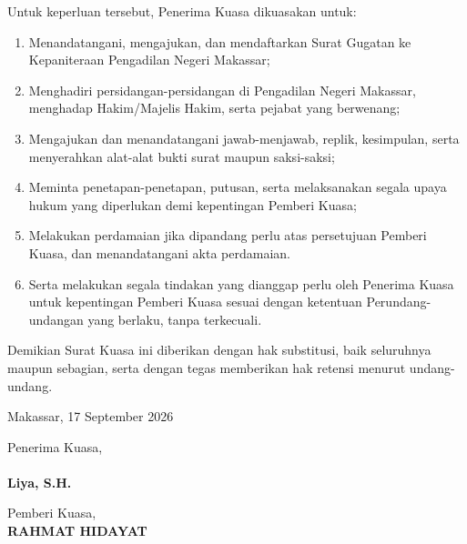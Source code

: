\documentclass{article}
\begin{document}
Untuk keperluan tersebut, Penerima Kuasa dikuasakan untuk:
\begin{enumerate}
    \item Menandatangani, mengajukan, dan mendaftarkan Surat Gugatan ke Kepaniteraan Pengadilan Negeri Makassar;
    \item Menghadiri persidangan-persidangan di Pengadilan Negeri Makassar, menghadap Hakim/Majelis Hakim, serta pejabat yang berwenang;
    \item Mengajukan dan menandatangani jawab-menjawab, replik, kesimpulan, serta menyerahkan alat-alat bukti surat maupun saksi-saksi;
    \item Meminta penetapan-penetapan, putusan, serta melaksanakan segala upaya hukum yang diperlukan demi kepentingan Pemberi Kuasa;
    \item Melakukan perdamaian jika dipandang perlu atas persetujuan Pemberi Kuasa, dan menandatangani akta perdamaian.
    \item Serta melakukan segala tindakan yang dianggap perlu oleh Penerima Kuasa untuk kepentingan Pemberi Kuasa sesuai dengan ketentuan Perundang-undangan yang berlaku, tanpa terkecuali.
\end{enumerate}

Demikian Surat Kuasa ini diberikan dengan hak substitusi, baik seluruhnya maupun sebagian, serta dengan tegas memberikan hak retensi menurut undang-undang.  

\vspace{1.5em}

\begin{flushright}
    Makassar, 17 September 2026 \\[2em]
\end{flushright}

\noindent
\begin{minipage}[t]{0.48\textwidth}
    Penerima Kuasa, \\[1em]
    \\[0.5em]
    \textbf{Liya, S.H.}
\end{minipage}
\hfill
\begin{minipage}[t]{0.48\textwidth}
    Pemberi Kuasa, \\[3.5em]
    \textbf{RAHMAT HIDAYAT}
\end{minipage}
\end{document}
